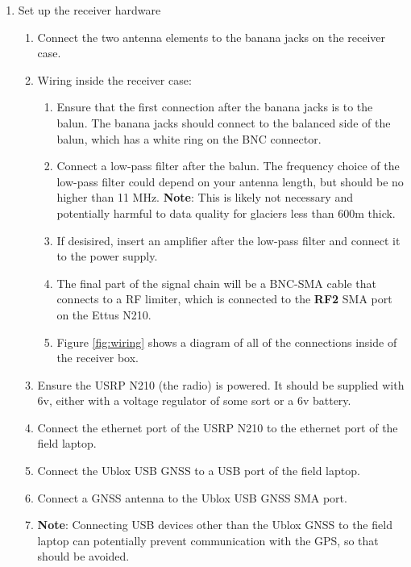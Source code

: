 \documentclass[titlepage]{article}
\begin{document}
\begin{enumerate}
    \item Set up the receiver hardware \begin{enumerate}
        \item Connect the two antenna elements to the banana jacks on the receiver case.
        \item Wiring inside the receiver case:
        \begin{enumerate}
            \item Ensure that the first connection after the banana jacks is to the balun. The banana jacks should connect to the balanced side of the balun, which has a white ring on the BNC connector.
            \item Connect a low-pass filter after the balun. The frequency choice of the low-pass filter could depend on your antenna length, but should be no higher than 11 MHz. \textbf{Note}: This is likely not necessary and potentially harmful to data quality for glaciers less than 600m thick.
            \item If desisired, insert an amplifier after the low-pass filter and connect it to the power supply.
            \item The final part of the signal chain will be a BNC-SMA cable that connects to a RF limiter, which is connected to the \textbf{RF2} SMA port on the Ettus N210.
            \item Figure \ref{fig:wiring} shows a diagram of all of the connections inside of the receiver box.
        \end{enumerate}
        \item Ensure the USRP N210 (the radio) is powered. It should be supplied with 6v, either with a voltage regulator of some sort or a 6v battery.
        \item Connect the ethernet port of the USRP N210 to the ethernet port of the field laptop. 
        \item Connect the Ublox USB GNSS to a USB port of the field laptop.
        \item Connect a GNSS antenna to the Ublox USB GNSS SMA port.
        \item \textbf{Note}: Connecting USB devices other than the Ublox GNSS to the field laptop can potentially prevent communication with the GPS, so that should be avoided.
    \end{enumerate}


\end{enumerate}
\end{document}
